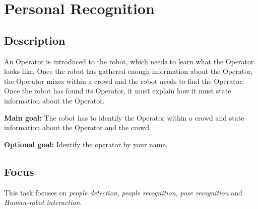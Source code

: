 \section{Personal Recognition}
\label{test:personal-recognition}

\subsection*{Description}
An Operator is introduced to the robot, which needs to learn what the Operator looks like. Once the robot has gathered enough information about the Operator, the Operator mixes within a crowd and the robot needs to find the Operator. Once the robot has found its Operator, it must explain how it must state information about the Operator.

\noindent \textbf{Main goal:}
The robot has to identify the Operator within a crowd and state information about the Operator and the crowd.

\noindent \textbf{Optional goal:}
Identify the operator by your name.

\subsection*{Focus}
This task focuses on
\textit{people detection},
\textit{people recognition},
\textit{pose recognition} and
\textit{Human-robot interaction}.


